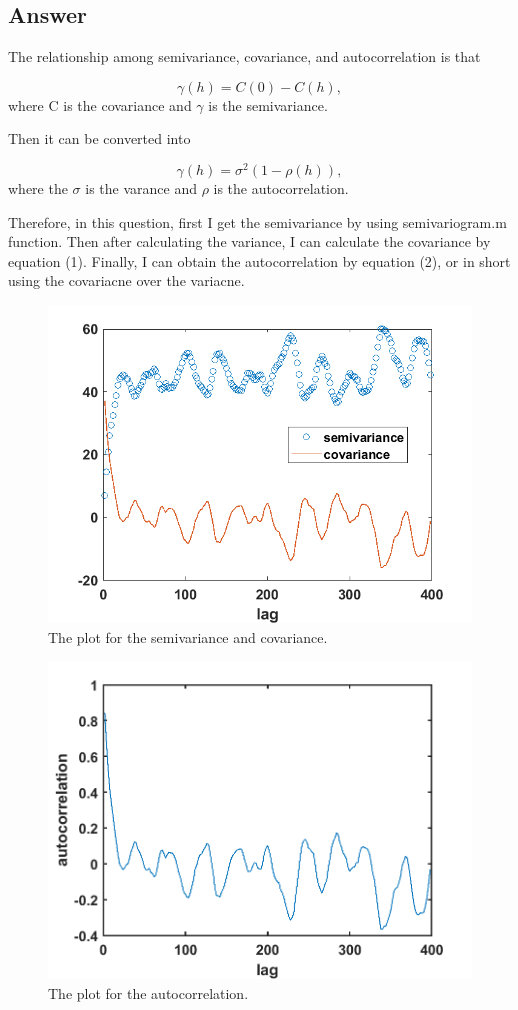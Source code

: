\documentclass[
	12pt, %
]{fphw}
\begin{document}

\subsection*{Answer} 

The relationship among semivariance, covariance, and autocorrelation is that 

\begin{equation}
	\gamma(h)=C(0)-C(h),
\end{equation}
where C is the covariance  and $\gamma$ is the semivariance.

Then it can be converted into

\begin{equation}
\gamma(h)=\sigma^2(1-\rho(h)),	
\end{equation}
where the $\sigma$ is the varance and $\rho$ is the autocorrelation.

Therefore, in this question, first I get the semivariance by using semivariogram.m function. Then after calculating the variance, I can calculate the covariance by equation (1). Finally, I can obtain the autocorrelation by equation (2), or in short using the covariacne over the variacne.


\begin{figure}[htbp]
	\centering
	\includegraphics[width=0.68\columnwidth]{Q3_1.png} 
	\caption{The plot for the semivariance and covariance.}
\end{figure}

\begin{figure}[htbp]
	\centering
	\includegraphics[width=0.68\columnwidth]{Q3_2.png} 
	\caption{The plot for the autocorrelation.}
\end{figure}
\end{document}
